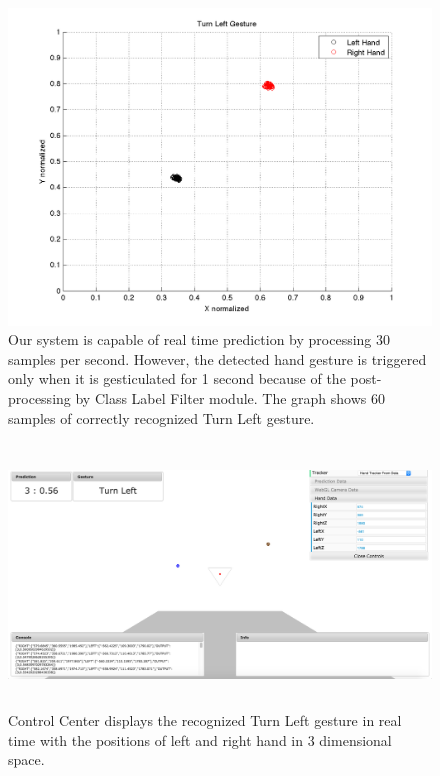 \begin{figure}
	[h] \hspace{-15 mm} \centering 
	\includegraphics[width=155mm]{figures/result/test-turn-left.png} \caption{Our system is capable of real time prediction by processing 30 samples per second. However, the detected hand gesture is triggered only when it is gesticulated for 1 second because of the post-processing by Class Label Filter module. The graph shows 60 samples of correctly recognized Turn Left gesture. }\label{res:pl:turn:left} 
\end{figure}
\begin{figure}
	[h] \centering 
	\includegraphics[height=70mm]{figures/result/cc-turn-left.jpg} \caption{Control Center displays the recognized Turn Left gesture in real time with the positions of left and right hand in 3 dimensional space.}
	
	\label{res:cc:turn:left} 
\end{figure}
